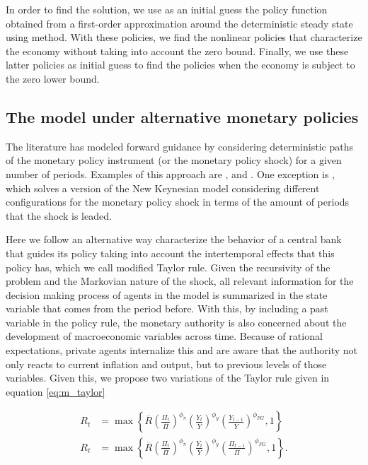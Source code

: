\documentclass[11pt]{article}
\numberwithin{equation}{section}
\begin{document}
In order to find the solution, we use as an initial guess the policy function obtained from a first-order approximation around the deterministic steady state using \cite{Sims2002} method. With these policies, we find the nonlinear policies that characterize the economy without taking into account the zero bound. Finally, we use these latter policies as initial guess to find the policies when the economy is subject to the zero lower bound.

\subsection{The model under alternative monetary policies}

The literature has modeled forward guidance by considering deterministic paths of the monetary policy instrument (or the monetary policy shock) for a given number of periods. Examples of this approach are \cite{DelNegroEtAl2015}, \cite{KaplanEtAl2016} and \cite{McKayEtAl2016}. One exception is \cite{KeenEtAl2016}, which solves a version of the New Keynesian model considering different configurations for the monetary policy shock in terms of the amount of periods that the shock is leaded.

Here we follow an alternative way characterize the behavior of a central bank that guides its policy taking into account the intertemporal effects that this policy has, which we call modified Taylor rule. Given the recursivity of the problem and the Markovian nature of the shock, all relevant information for the decision making process of agents in the model is summarized in the state variable that comes from the period before. With this, by including a past variable in the policy rule, the monetary authority is also concerned about the development of macroeconomic variables across time. Because of rational expectations, private agents internalize this and are aware that the authority not only reacts to current inflation and output, but to previous levels of those variables. Given this, we propose two variations of the Taylor rule given in equation \eqref{eq:m_taylor}

\begin{align}
	R_t&=\max\left\{\overline R\left(\frac{\Pi_t}{\overline\Pi}\right)^{\phi_{\pi}}\left(\frac{Y_t}{\overline{Y}}\right)^{\phi_{y}}\left(\frac{Y_{t-1}}{\overline{Y}}\right)^{\phi_{FG}},1\right\}\label{eq:m_taylor_fg1}\\
	R_t&=\max\left\{\overline R\left(\frac{\Pi_t}{\overline\Pi}\right)^{\phi_{\pi}}\left(\frac{Y_t}{\overline{Y}}\right)^{\phi_{y}}\left(\frac{\Pi_{t-1}}{\overline\Pi}\right)^{\phi_{FG}},1\right\}\label{eq:m_taylor_fg2}.
\end{align}
\end{document}
